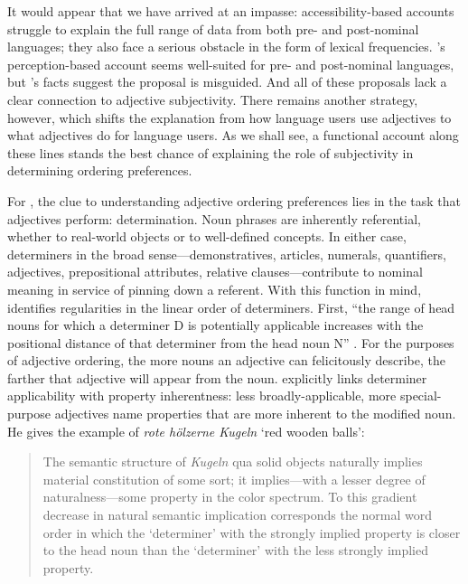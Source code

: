 \documentclass[preprint,authoryear]{elsarticle}\frenchspacing
\begin{document}
It would appear that we have arrived at an impasse: accessibility-based accounts struggle to explain the full range of data from both pre- and post-nominal languages; they also face a serious obstacle in the form of lexical frequencies. \citeauthor{bever1970}'s perception-based account seems well-suited for pre- and post-nominal languages, but \citeauthor{wulff2003}'s facts suggest the proposal is misguided. And all of these proposals lack a clear connection to adjective subjectivity. There remains another strategy, however, which shifts the explanation from how language users use adjectives to what adjectives do for language users. As we shall see, a functional account along these lines stands the best chance of explaining the role of subjectivity in determining ordering preferences.

For \cite{seiler1978}, the clue to understanding adjective ordering preferences lies in the task that adjectives perform: determination. Noun phrases are inherently referential, whether to real-world objects or to well-defined concepts. In either case, determiners in the broad sense---demonstratives, articles, numerals, quantifiers, adjectives, prepositional attributes, relative clauses---contribute to nominal meaning in service of pinning down a referent. With this function in mind, \citeauthor{seiler1978} identifies regularities in the linear order of determiners. First, ``the range of head nouns for which a determiner D is potentially applicable increases with the positional distance of that determiner from the head noun N'' \citep[p.~308]{seiler1978}. For the purposes of adjective ordering, the more nouns an adjective can felicitously describe, the farther that adjective will appear from the noun. \citeauthor{seiler1978} explicitly links determiner applicability with property inherentness: less broadly-applicable, more special-purpose adjectives name properties that are more inherent to the modified noun. He gives the example of \emph{rote h\"{o}lzerne Kugeln} `red wooden balls':

\begin{quotation}The semantic structure of \emph{Kugeln} qua solid objects naturally implies material constitution of some sort; it implies---with a lesser degree of naturalness---some property in the color spectrum. To this gradient decrease in natural semantic implication corresponds the normal word order in which the `determiner' with the strongly implied property is closer to the head noun than the `determiner' with the less strongly implied property. \citep[p.~309]{seiler1978}\end{quotation}
\end{document}
